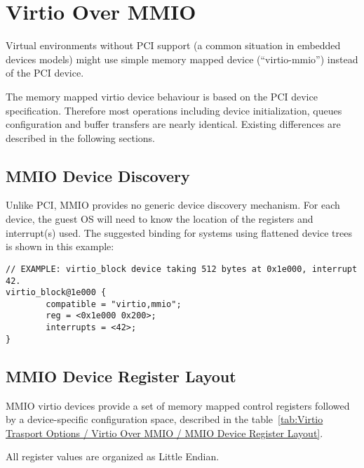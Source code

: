 \section{Virtio Over MMIO}\label{sec:Virtio Transport Options / Virtio Over MMIO}

Virtual environments without PCI support (a common situation in
embedded devices models) might use simple memory mapped device
(``virtio-mmio'') instead of the PCI device.

The memory mapped virtio device behaviour is based on the PCI
device specification. Therefore most operations including device
initialization, queues configuration and buffer transfers are
nearly identical. Existing differences are described in the
following sections.

\subsection{MMIO Device Discovery}\label{sec:Virtio Transport Options / Virtio Over MMIO / MMIO Device Discovery}

Unlike PCI, MMIO provides no generic device discovery mechanism.  For each
device, the guest OS will need to know the location of the registers
and interrupt(s) used.  The suggested binding for systems using
flattened device trees is shown in this example:

\begin{lstlisting}
// EXAMPLE: virtio_block device taking 512 bytes at 0x1e000, interrupt 42.
virtio_block@1e000 {
        compatible = "virtio,mmio";
        reg = <0x1e000 0x200>;
        interrupts = <42>;
}
\end{lstlisting}

\subsection{MMIO Device Register Layout}\label{sec:Virtio Transport Options / Virtio Over MMIO / MMIO Device Register Layout}

MMIO virtio devices provide a set of memory mapped control
registers followed by a device-specific configuration space,
described in the table~\ref{tab:Virtio Trasport Options / Virtio Over MMIO / MMIO Device Register Layout}.

All register values are organized as Little Endian.

\newcommand{\mmioreg}[5]{%
  {\field{#1}} \newline #3 \newline #4 & {\bf#2} \newline #5 \\
}

